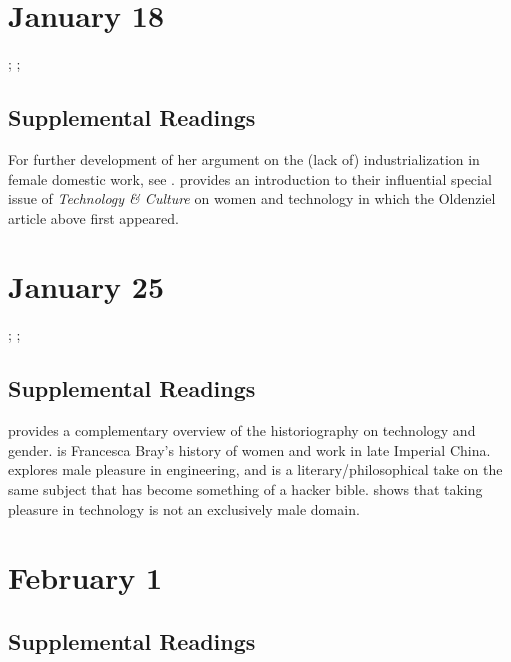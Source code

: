 \documentclass[11pt]{article}
\begin{document}

\section{January 18}
\label{sec:org3570e6c}

; ; 

\subsection{Supplemental Readings}
\label{sec:orgadb53ae}

For further development of her argument on the (lack of)
industrialization in female domestic work, see \cite{Cowan:1983vm}.
\cite{Lerman:1997ui} provides an introduction to their influential
special issue of \emph{Technology \& Culture} on women and technology in which
the Oldenziel article above first appeared.

\section{January 25}
\label{sec:orgb32e610}

; ; 

\subsection{Supplemental Readings}
\label{sec:org7a43bb5}

\cite{Wajcman:2000vq} provides a complementary overview of the historiography on technology and gender.  \cite{Bray:1997wl} is Francesca Bray’s history of women and work in late Imperial China.   \cite{Florman:1996um} explores male pleasure in engineering, and \cite{Pirsig:1974vs} is a literary/philosophical take on the same subject that has become something of a hacker bible.   \cite{Ullman:1997vv} shows that taking pleasure in technology is not an exclusively male domain. 

\section{February 1}
\label{sec:orgb811680}


\subsection{Supplemental Readings}
\label{sec:org7002c00}
\end{document}
